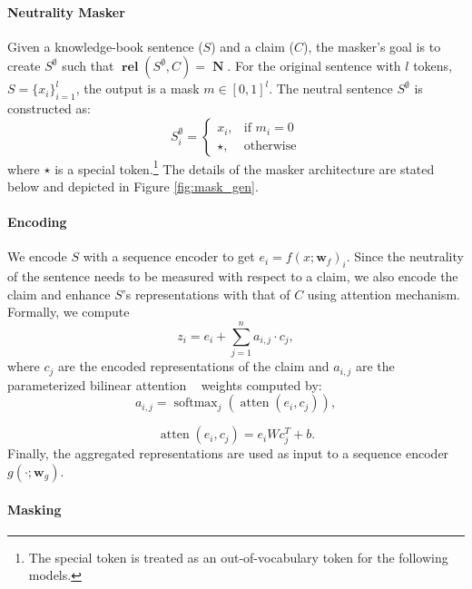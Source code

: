\documentclass[letterpaper]{article} %
\newcommand{\figref}[1]{Figure \ref{#1}}
\DeclareMathOperator{\rel}{\boldsymbol{rel}}
\DeclareMathOperator{\atten}{atten}
\DeclareMathOperator{\softmax}{softmax}
\DeclareMathOperator{\N}{\boldsymbol{N}}
\begin{document}
\paragraph{Neutrality Masker} Given a knowledge-book sentence ($S$) and a claim ($C$), the masker's goal is to create $S^{\emptyset}$ such that $\rel(S^{\emptyset},C) = \N$. For the original sentence with $l$ tokens, $S = \{x_i\}_{i=1}^{l}$, the output is a mask $m\in[0,1]^l$. The neutral sentence $S^{\emptyset}$ is constructed as:
\begin{equation}
  {S^\emptyset_i}=\begin{cases}
    x_i, & \text{if $m_i=0$}\\
    \star, & \text{otherwise}
  \end{cases}
\end{equation}
where $\star$ is a special token.\footnote{The special token is treated as an out-of-vocabulary token for the following models.} The details of the masker architecture are stated below and depicted in \figref{fig:mask_gen}.





\paragraph{Encoding}
We encode $S$ with a sequence encoder to get $e_i = f(x; \boldsymbol{w}_f)_i$.
Since the neutrality of the sentence needs to be measured with respect to a claim, we also encode the claim and enhance $S$'s representations with that of $C$ using attention mechanism. Formally, we compute
\begin{equation}
	z_i = e_i + \sum_{j=1}^n a_{i,j}\cdot c_j ,
\end{equation}
where $c_j$ are the encoded representations of the claim and $a_{i,j}$ are the parameterized bilinear attention ~\cite{kim2018bilinear} weights computed by:
\begin{equation}
	a_{i,j} = \softmax_j(\atten(e_i, c_j)),
\end{equation}

\begin{equation}
	\atten(e_i, c_j) = e_i W c_j^T + b.
\end{equation}
Finally, the aggregated representations are used as input to a sequence encoder $g(\cdot; \boldsymbol{w}_g)$.


\paragraph{Masking}
\end{document}
